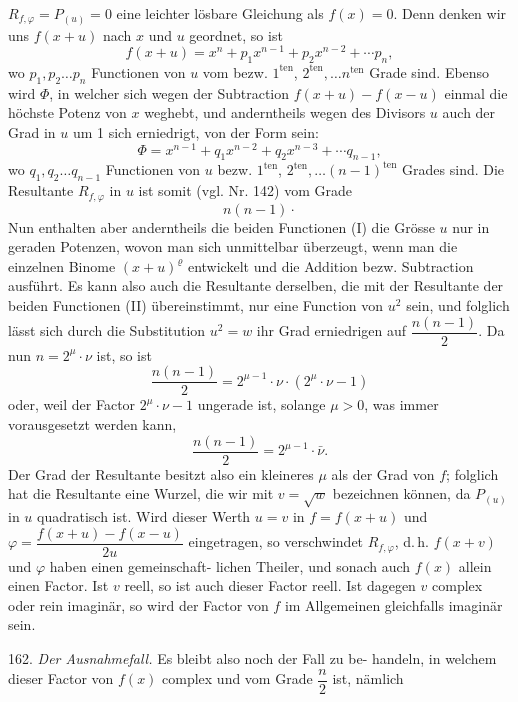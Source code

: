\documentclass[11pt]{article}
\providecommand{\weberpage}[1]{}
\let\Phi\varPhi
\begin{document}
$R_{f,\varphi} = P_{(u)} = 0$ eine leichter lösbare Gleichung als $f(x) = 0$. Denn
denken wir uns $f(x+u)$ nach $x$ und $u$ geordnet, so ist
\[ f(x+u) = x^n + p_1x^{n-1} + p_2x^{n-2} + \cdots p_n, \]
wo $p_1, p_2 \ldots p_n$ Functionen von $u$ vom bezw. $1^{\text{ten}}$, $2^{\text{ten}}, \ldots n^{\text{ten}}$ Grade
sind. Ebenso wird $\Phi$, in welcher sich wegen der Subtraction
$f(x+u) - f(x-u)$ einmal die höchste Potenz von $x$ weghebt, und
anderntheils wegen des Divisors $u$ auch der Grad in $u$ um 1 sich
erniedrigt, von der Form sein:
\[ \Phi = x^{n-1} + q_1x^{n-2} + q_2x^{n-3} + \cdots q_{n-1}, \]
wo $q_1, q_2 \ldots q_{n-1}$ Functionen von $u$ bezw. $1^{\text{ten}}$, $2^{\text{ten}}, \ldots (n-1)^{\text{ten}}$ Grades
sind. Die Resultante $R_{f,\varphi}$ in $u$ ist somit (vgl. Nr. 142) vom Grade
\[ n(n-1)\cdot \]
Nun enthalten aber anderntheils die beiden Functionen (I) die Grösse $u$
nur in geraden Potenzen, wovon man sich unmittelbar überzeugt, wenn
man die einzelnen Binome $(x+u)^\varrho$ entwickelt und die Addition bezw.
Subtraction ausführt. Es kann also auch die Resultante derselben,
die mit der Resultante der beiden Functionen (II) übereinstimmt, nur
eine Function von $u^2$ sein, und folglich lässt sich durch die Substitution
$u^2 = w$ ihr Grad erniedrigen auf $\dfrac{n(n-1)}{2}$. Da nun $n = 2^\mu \cdot \nu$ ist,
so ist
\[ \frac{n(n-1)}{2} = 2^{\mu-1} \cdot \nu \cdot (2^\mu \cdot \nu - 1) \]
oder, weil der Factor $2^\mu \cdot \nu - 1$ ungerade ist, solange $\mu > 0$, was immer
vorausgesetzt werden kann,
\[ \frac{n(n-1)}{2} = 2^{\mu-1} \cdot \bar{\nu}. \]
Der Grad der Resultante besitzt also ein kleineres $\mu$ als der Grad
von $f$; folglich hat die Resultante eine Wurzel, die wir mit $v = \sqrt{w}$
bezeichnen können, da $P_{(u)}$ in $u$ quadratisch ist. Wird dieser Werth
$u = v$ in $f = f(x+u)$ und $\varphi = \dfrac{f(x+u) - f(x-u)}{2u}$ eingetragen, so
verschwindet $R_{f,\varphi}$, d.\,h. $f(x+v)$ und $\varphi$ haben einen gemeinschaft-
lichen Theiler, und sonach auch $f(x)$ allein einen Factor. Ist $v$ reell, so
ist auch dieser Factor reell. Ist dagegen $v$ complex oder rein imaginär,
so wird der Factor von $f$ im Allgemeinen gleichfalls imaginär sein.

162. \textit{Der Ausnahmefall.} Es bleibt also noch der Fall zu be-
handeln, in welchem dieser Factor von $f(x)$ complex und vom Grade $\dfrac{n}{2}$
ist, nämlich


\weberpage{172}
\end{document}

